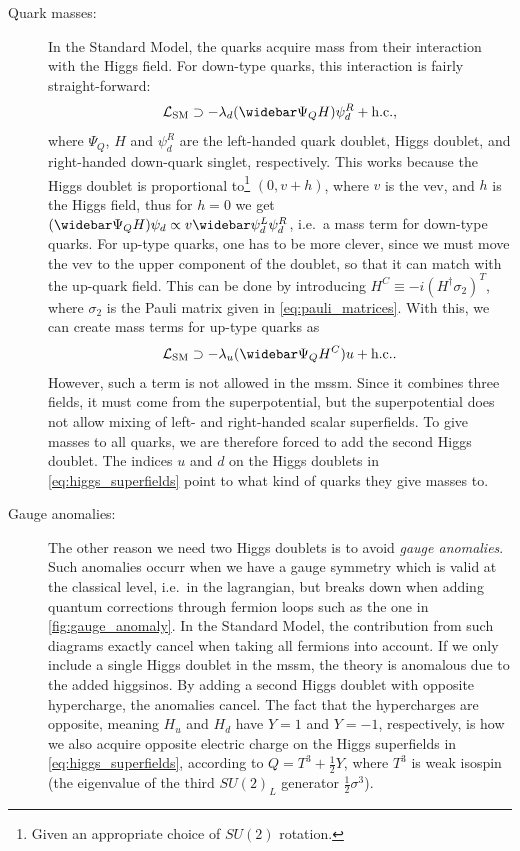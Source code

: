 \begin{description}
    \item[Quark masses:] In the Standard Model, the quarks acquire mass from their interaction with the Higgs field. For down-type quarks, this interaction is fairly straight-forward:
    \begin{equation}\label{eq:sm_down_mass}
        \mathcal{L}_{\mathrm{SM}} \supset -\lambda_d (\widebar\Psi_Q H)\psi_d^R + \text{h.c.},
    \end{equation}
    where $\Psi_Q$, $H$ and $\psi_d^R$ are the left-handed quark doublet, Higgs doublet, and right-handed down-quark singlet, respectively.
    This works because the Higgs doublet is proportional to\footnote{Given an appropriate choice of $SU(2)$ rotation.} $(0, v+h)$, where $v$ is the \gls{vev}, and $h$ is the Higgs field, thus for $h=0$ we get $(\widebar\Psi_Q H)\psi_d \propto v\widebar\psi_d^L\psi_d^R$, i.e.\ a mass term for down-type quarks.
    For up-type quarks, one has to be more clever, since we must move the \gls{vev} to the upper component of the doublet, so that it can match with the up-quark field. This can be done by introducing $H^C \equiv -i(H^\dagger \sigma_2)^T$, where $\sigma_2$ is the Pauli matrix given in \cref{eq:pauli_matrices}. With this, we can create mass terms for up-type quarks as
    \begin{equation}
        \mathcal{L}_{\mathrm{SM}} \supset -\lambda_u (\widebar\Psi_Q H^C)u + \text{h.c.}.
    \end{equation}
    However, such a term is not allowed in the \gls{mssm}. Since it combines three fields, it must come from the superpotential, but the superpotential does not allow mixing of left- and right-handed scalar superfields. To give masses to all quarks, we are therefore forced to add the second Higgs doublet. The indices $u$ and $d$ on the Higgs doublets in \cref{eq:higgs_superfields} point to what kind of quarks they give masses to.
    
    \item[Gauge anomalies:] The other reason we need two Higgs doublets is to avoid \emph{gauge anomalies}. Such anomalies occurr when we have a gauge symmetry which is valid at the classical level, i.e.\ in the lagrangian, but breaks down when adding quantum corrections through fermion loops such as the one in \cref{fig:gauge_anomaly}.
    In the Standard Model, the contribution from such diagrams exactly cancel when taking all fermions into account. If we only include a single Higgs doublet in the \gls{mssm}, the theory is anomalous due to the added higgsinos. By adding a second Higgs doublet with opposite hypercharge, the anomalies cancel.
    The fact that the hypercharges are opposite, meaning $H_u$ and $H_d$ have $Y=1$ and $Y=-1$, respectively, is how we also acquire opposite electric charge on the Higgs superfields in \cref{eq:higgs_superfields}, according to $Q=T^3 + \frac{1}{2}Y$, where $T^3$ is weak isospin (the eigenvalue of the third $SU(2)_L$ generator $\frac{1}{2}\sigma^3$).
\end{description}

